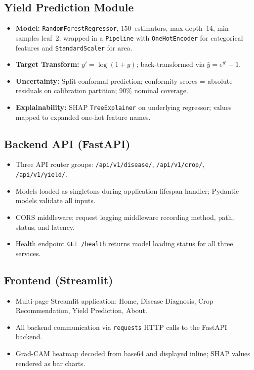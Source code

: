 \documentclass[12pt,a4paper]{report}
\begin{document}
\subsection{Yield Prediction Module}
\begin{itemize}[leftmargin=*]
  \item \textbf{Model:} \texttt{RandomForestRegressor}, 150~estimators, max depth~14, min samples leaf~2; wrapped in a \texttt{Pipeline} with \texttt{OneHotEncoder} for categorical features and \texttt{StandardScaler} for area.
  \item \textbf{Target Transform:} $y' = \log(1+y)$; back-transformed via $\hat{y} = e^{\hat{y}'} - 1$.
  \item \textbf{Uncertainty:} Split conformal prediction; conformity scores = absolute residuals on calibration partition; 90\% nominal coverage.
  \item \textbf{Explainability:} SHAP \texttt{TreeExplainer} on underlying regressor; values mapped to expanded one-hot feature names.
\end{itemize}

\subsection{Backend API (FastAPI)}
\begin{itemize}[leftmargin=*]
  \item Three API router groups: \texttt{/api/v1/disease/}, \texttt{/api/v1/crop/}, \texttt{/api/v1/yield/}.
  \item Models loaded as singletons during application lifespan handler; Pydantic models validate all inputs.
  \item CORS middleware; request logging middleware recording method, path, status, and latency.
  \item Health endpoint \texttt{GET /health} returns model loading status for all three services.
\end{itemize}

\subsection{Frontend (Streamlit)}
\begin{itemize}[leftmargin=*]
  \item Multi-page Streamlit application: Home, Disease Diagnosis, Crop Recommendation, Yield Prediction, About.
  \item All backend communication via \texttt{requests} HTTP calls to the FastAPI backend.
  \item Grad-CAM heatmap decoded from base64 and displayed inline; SHAP values rendered as bar charts.
\end{itemize}
\end{document}
